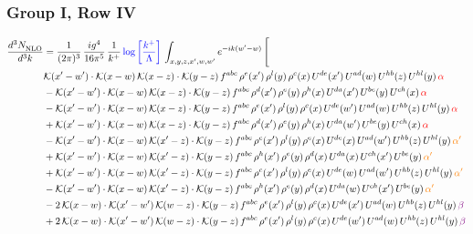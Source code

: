 \documentclass[9pt]{article}
\numberwithin{equation}{section}
\begin{document}
\subsubsection{Group I, Row IV}
\begin{align}
    \frac{d^{3}N_{\rm NLO}^{\rm}}{d^{3}k}  & = \frac{1}{(2\pi)^{3}}\, \frac{ig^{4}}{16\pi^{5}}\, \frac{1}{k^{+}}\, {\color{blue}\log{\left[\frac{k^{+}}{\Lambda}\right]}}\, \int_{x,y,z,x^{\prime},w,w^{\prime}}e^{-ik(w^{\prime}-w)}\, \Bigg[\notag \\ & \mathcal{K}(x'-w')\cdot \mathcal{K}(x-w)\,\mathcal{K}(x-z)\cdot \mathcal{K}(y-z)\,f^{abc}\, \rho^{e}(x')\, \rho^{l}(y)\,\rho^{c}(x)\, U^{de}(x')\,U^{ad}(w)\,U^{hb}(z)\,U^{hl}(y)\, {\color{red}\alpha}\notag \\ & -\mathcal{K}(x'-w')\cdot \mathcal{K}(x-w)\,\mathcal{K}(x-z)\cdot \mathcal{K}(y-z)\,f^{abc}\, \rho^{d}(x')\, \rho^{e}(y)\,\rho^{h}(x)\, U^{da}(x')\,U^{be}(y)\,U^{ch}(x)\,{\color{red} \alpha}\notag \\ & -\mathcal{K}(x'-w')\cdot \mathcal{K}(x-w)\,\mathcal{K}(x-z)\cdot \mathcal{K}(y-z)\,f^{abc}\, \rho^{e}(x')\, \rho^{l}(y)\,\rho^{c}(x)\, U^{de}(w')\,U^{ad}(w)\,U^{hb}(z)\,U^{hl}(y)\,{\color{red} \alpha}\notag\\ & +\mathcal{K}(x'-w')\cdot \mathcal{K}(x-w)\,\mathcal{K}(x-z)\cdot \mathcal{K}(y-z)\,f^{abc}\, \rho^{d}(x')\, \rho^{e}(y)\,\rho^{h}(x)\, U^{da}(w')\,U^{be}(y)\,U^{ch}(x)\,{\color{red} \alpha}\notag\\ &-\mathcal{K}(x'-w')\cdot\mathcal{K}(x-w)\,\mathcal{K}(x'-z)\cdot\mathcal{K}(y-z)\, f^{abc}\,\rho^{c}(x')\,\rho^{l}(y)\,\rho^{e}(x)\,U^{de}(x)\,U^{ad}(w')\,U^{hb}(z)\,U^{hl}(y)\,{\color{orange} \alpha'}\notag\\ & +\mathcal{K}(x'-w')\cdot\mathcal{K}(x-w)\,\mathcal{K}(x'-z)\cdot\mathcal{K}(y-z)\, f^{abc}\,\rho^{h}(x')\,\rho^{e}(y)\,\rho^{d}(x)\,U^{da}(x)\,U^{ch}(x')\,U^{be}(y)\,{\color{orange} \alpha'}\notag\\
&+\mathcal{K}(x'-w')\cdot\mathcal{K}(x-w)\,\mathcal{K}(x'-z)\cdot\mathcal{K}(y-z)\, f^{abc}\,\rho^{c}(x')\,\rho^{l}(y)\,\rho^{e}(x)\,U^{de}(w)\,U^{ad}(w')\,U^{hb}(z)\,U^{hl}(y)\,{\color{orange} \alpha'}\notag \\ &-\mathcal{K}(x'-w')\cdot\mathcal{K}(x-w)\,\mathcal{K}(x'-z)\cdot\mathcal{K}(y-z)\, f^{abc}\,\rho^{h}(x')\,\rho^{e}(y)\,\rho^{d}(x)\,U^{da}(w)\,U^{ch}(x')\,U^{be}(y)\,{\color{orange} \alpha'}\notag \\ &  -2\,\mathcal{K}(x-w)\cdot \mathcal{K}(x'-w')\, \mathcal{K}(w-z)\cdot \mathcal{K}(y-z)\, f^{abc}\,\rho^{e}(x')\,\rho^{l}(y)\,\rho^{c}(x)\, U^{de}(x')\,U^{ad}(w)\,U^{hb}(z)\,U^{hl}(y)\,{\color{violet} \beta}\notag\\ & +2\,\mathcal{K}(x-w)\cdot \mathcal{K}(x'-w')\, \mathcal{K}(w-z)\cdot \mathcal{K}(y-z)\, f^{abc}\,\rho^{e}(x')\,\rho^{l}(y)\,\rho^{c}(x)\, U^{de}(w')\,U^{ad}(w)\,U^{hb}(z)\,U^{hl}(y)\,{\color{violet} \beta}\notag\\

\end{align}
\end{document}
